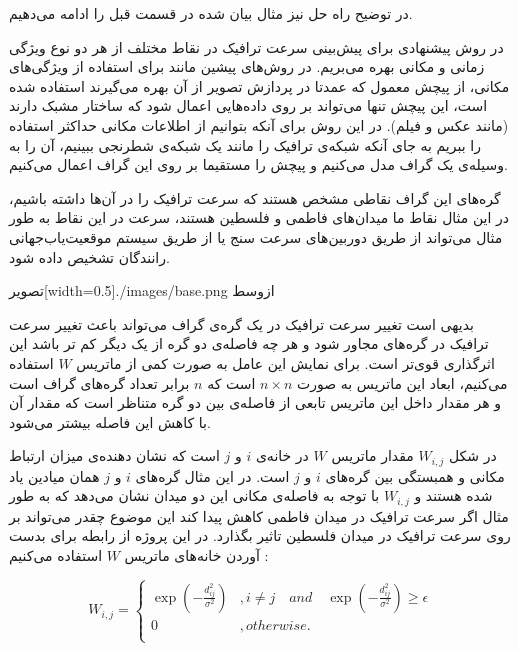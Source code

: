 
در توضیح راه حل نیز مثال بیان شده در قسمت قبل را ادامه می‌دهیم.

در روش پیشنهادی برای پیش‌بینی سرعت ترافیک در نقاط مختلف از هر دو نوع ویژگی زمانی و مکانی بهره می‌بریم.
در روش‌های پیشین مانند  برای استفاده از ویژگی‌های مکانی، از پیچش معمول که عمدتا در پردازش تصویر از آن بهره می‌گیرند استفاده شده است، این پیچش تنها می‌تواند بر روی داده‌هایی اعمال شود که ساختار مشبک دارند (مانند عکس و فیلم).
در این روش برای آنکه بتوانیم از اطلاعات مکانی حداکثر استفاده را ببریم به جای آنکه شبکه‌ی ترافیک را مانند یک شبکه‌‌ی شطرنجی ببینیم،
آن را به وسیله‌ی یک گراف مدل می‌کنیم و پیچش را مستقیما بر روی این گراف اعمال می‌کنیم.

گره‌های این گراف نقاطی مشخص هستند که سرعت ترافیک را در آن‌ها داشته باشیم، در این مثال نقاط ما میدان‌های فاطمی و فلسطین هستند،
سرعت در این نقاط به طور مثال می‌تواند از طریق دوربین‌های سرعت سنج یا از طریق سیستم موقعیت‌‌یاب‌جهانی رانندگان تشخیص داده شود.

  ‌تصویر[width=0.5\textwidth]{./images/base.png}
  ‌ازوسط

بدیهی است تغییر سرعت ترافیک در یک گره‌ی گراف می‌تواند باعث تغییر سرعت ترافیک در گره‌های مجاور شود و هر چه فاصله‌ی دو گره از یک دیگر کم تر باشد این اثرگذاری قوی‌تر است.
برای نمایش این عامل به صورت کمی از ماتریس $W$ استفاده می‌کنیم، ابعاد این ماتریس به صورت $n \times n$ است که $n$ برابر تعداد گره‌های گراف است و هر مقدار داخل این ماتریس تابعی از فاصله‌ی بین دو گره متناظر است که مقدار آن با کاهش این فاصله بیشتر می‌شود.

در شکل 
$W_{i,j}$ مقدار ماتریس $W$ در خانه‌ی $i$ و $j$ است که نشان دهنده‌ی میزان ارتباط مکانی و همبستگی بین گره‌های $i$ و $j$ است.
در این مثال گره‌های $i$ و $j$ همان میادین یاد شده هستند و $W_{i,j}$ با توجه به فاصله‌ی مکانی این دو میدان نشان می‌دهد که
به طور مثال اگر سرعت ترافیک در میدان فاطمی کاهش پیدا کند این موضوع چقدر می‌تواند بر روی سرعت ترافیک در میدان فلسطین تاثیر بگذارد.
در این پروژه از رابطه‌  برای بدست آوردن خانه‌های ماتریس $W$ استفاده می‌کنیم :

\begin{equation}
  W_{i,j} = \left\{
    \begin{array}{ll}
      \exp(-\frac{d^{2}_{ij}}{\sigma^{2}}) & , i \neq j \quad and \quad \exp(-\frac{d^{2}_{ij}}{\sigma^{2}}) \geq \epsilon \\
      0 & , otherwise. \\
    \end{array}\right.
  \label{eq:distance}
\end{equation}

